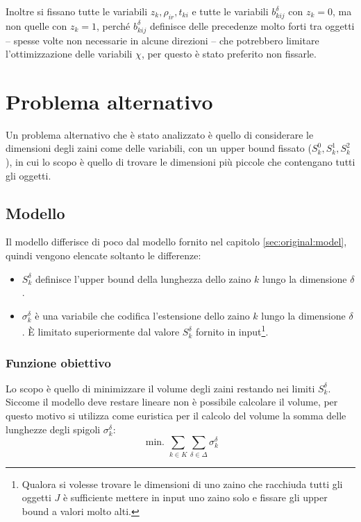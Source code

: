 \documentclass{scrartcl}
\begin{document}
Inoltre si fissano tutte le variabili $z_k, \rho_{ir}, t_{ki}$ e tutte le variabili $b_{kij}^\delta$ con $z_k = 0$, ma non quelle con $z_k = 1$, perché $b_{kij}^\delta$ definisce delle precedenze molto forti tra oggetti -- spesse volte non necessarie in alcune direzioni -- che potrebbero limitare l'ottimizzazione delle variabili $\chi$, per questo è stato preferito non fissarle.


\section{Problema alternativo}
\label{sec:extension2}
Un problema alternativo che è  stato analizzato è quello di considerare le dimensioni degli zaini come delle variabili, con un upper bound fissato ($S_k^0, S_k^1, S_k^2$), in cui lo scopo è quello di trovare le dimensioni più piccole che contengano tutti gli oggetti.

\subsection{Modello}
Il modello differisce di poco dal modello fornito nel capitolo \ref{sec:original:model}, quindi vengono elencate soltanto le differenze:
\begin{itemize}
	\item $S_k^\delta$ definisce l'upper bound della lunghezza dello zaino $k$ lungo la dimensione $\delta$.
	\item $\sigma_k^\delta$ è una variabile che codifica l'estensione dello zaino $k$ lungo la dimensione $\delta$. È limitato superiormente dal valore $S_k^\delta$ fornito in input\footnote{Qualora si volesse trovare le dimensioni di uno zaino che racchiuda tutti gli oggetti $J$ è sufficiente
	mettere in input uno zaino solo e fissare gli upper bound a valori molto alti.}. 
\end{itemize}
\subsubsection{Funzione obiettivo}
Lo scopo è quello di minimizzare il volume degli zaini restando nei limiti $S_k^\delta$. Siccome il modello deve restare lineare non è possibile calcolare il volume, per questo motivo si utilizza come euristica per il calcolo del volume la somma delle lunghezze degli spigoli $\sigma_k^\delta$:
\begin{equation}
\text{ min. } \sum_{k \in K} \sum_{\delta \in \Delta} \sigma_k^\delta
\end{equation}
\end{document}

